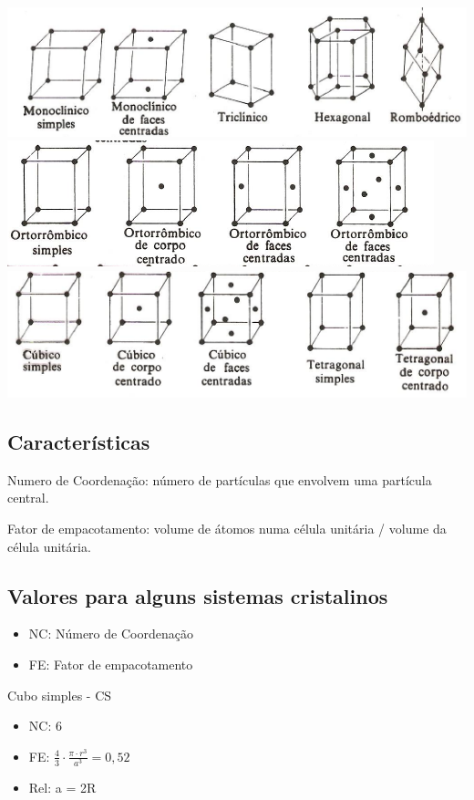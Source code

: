  \includegraphics[scale=0.5,trim={0 0 0 0}]{figures/var1}
 \includegraphics[scale=0.45,trim={0 0 0 0}]{figures/var2}
 \includegraphics[scale=0.5,trim={0 0 0 0}]{figures/var3}



\subsection*{Características}

Numero de Coordenação: número de partículas que envolvem uma partícula central.

Fator de empacotamento: volume de átomos numa célula unitária / volume da célula unitária.

\subsection*{Valores para alguns sistemas cristalinos}

\begin{itemize}
	\setlength{\parskip}{0pt}
	\setlength{\itemsep}{0pt plus 1pt}
	
	\item NC: Número de Coordenação
	\item FE: Fator de empacotamento
\end{itemize}


Cubo simples - CS
\begin{itemize}
	\setlength{\parskip}{0pt}
	\setlength{\itemsep}{0pt plus 1pt}
	
	\item NC: 6
	\item FE: $\frac{4}{3} \cdot \frac{\pi \cdot r^{3}}{a^{3}} = 0,52$
	\item Rel: a = 2R
	
\end{itemize}



